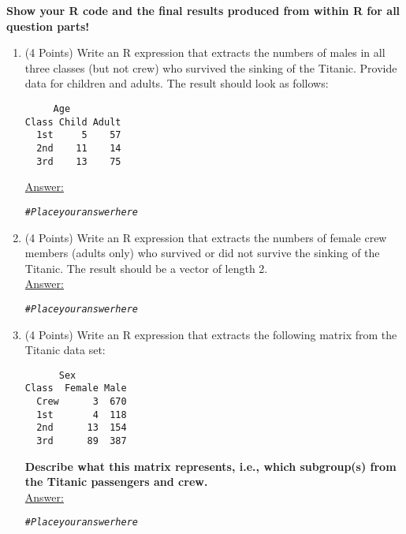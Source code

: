 \documentclass[12pt,letterpaper,final]{article}\usepackage[]{graphicx}\usepackage[]{xcolor}
\makeatletter
\newcommand{\hlcom}[1]{\textcolor[rgb]{0.678,0.584,0.686}{\textit{#1}}}%
\newenvironment{kframe}{%
 \def\at@end@of@kframe{}%
 \ifinner\ifhmode%
  \def\at@end@of@kframe{\end{minipage}}%
  \begin{minipage}{\columnwidth}%
 \fi\fi%
 \def\FrameCommand##1{\hskip\@totalleftmargin \hskip-\fboxsep
 \colorbox{shadecolor}{##1}\hskip-\fboxsep
     \hskip-\linewidth \hskip-\@totalleftmargin \hskip\columnwidth}%
 \MakeFramed {\advance\hsize-\width
   \@totalleftmargin\z@ \linewidth\hsize
   \@setminipage}}%
 {\par\unskip\endMakeFramed%
 \at@end@of@kframe}
\newenvironment{knitrout}{}{} %
\makeatother
\begin{document}
\begin{enumerate}
{\bf Show your R code and the final results produced from within R
for all question parts!}

\begin{enumerate}
\item (4 Points)
Write an R expression that extracts the numbers of males in all three classes (but not crew)
who survived the sinking of the Titanic. Provide data for children and adults.
The result should look as follows:
\begin{verbatim}
     Age
Class Child Adult
  1st     5    57
  2nd    11    14
  3rd    13    75
\end{verbatim}

\underline{Answer:}
\begin{knitrout}
\color{fgcolor}\begin{kframe}
\begin{alltt}
\hlcom{# Place your answer here}
\end{alltt}
\end{kframe}
\end{knitrout}


\item (4 Points)
Write an R expression that extracts the numbers of female crew members (adults only)
who survived or did not survive the sinking of the Titanic. 
The result should be a vector of length 2. \\

\underline{Answer:}
\begin{knitrout}
\color{fgcolor}\begin{kframe}
\begin{alltt}
\hlcom{# Place your answer here}
\end{alltt}
\end{kframe}
\end{knitrout}


\item (4 Points)
Write an R expression that extracts the following matrix from the Titanic data set:
\begin{verbatim}
      Sex
Class  Female Male
  Crew      3  670
  1st       4  118
  2nd      13  154
  3rd      89  387
\end{verbatim}
{\bf Describe what this matrix represents, i.e., which subgroup(s) from the Titanic 
passengers and crew.} \\

\underline{Answer:}
\begin{knitrout}
\color{fgcolor}\begin{kframe}
\begin{alltt}
\hlcom{# Place your answer here}
\end{alltt}
\end{kframe}
\end{knitrout}


\end{enumerate}
\end{enumerate}
\end{document}
